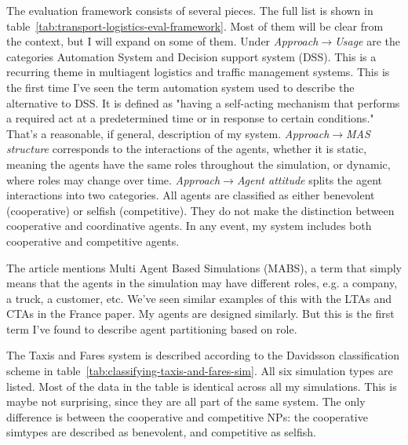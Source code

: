 \documentclass[11pt,letterpaper,onecolumn,twoside,openright,draft]{report}
\begin{document}
The evaluation framework consists of several pieces.
The full list is shown in table~\ref{tab:transport-logistics-eval-framework}.
Most of them will be clear from the context, but I will expand on some of them.
Under \emph{Approach}$\to$\emph{Usage} are the categories Automation System and Decision support system (DSS).
This is a recurring theme in multiagent logistics and traffic management systems.
This is the first time I've seen the term automation system used to describe the alternative to DSS.
It is defined as "having a self-acting mechanism that performs a required act at a predetermined time or in response to certain conditions."
That's a reasonable, if general, description of my system.
\emph{Approach}$\to$\emph{MAS structure} corresponds to the interactions of the agents, whether it is static, meaning the agents have the same roles throughout the simulation, or dynamic, where roles may change over time.
\emph{Approach}$\to$\emph{Agent attitude} splits the agent interactions into two categories.
All agents are classified as either benevolent (cooperative) or selfish (competitive).
They do not make the distinction between cooperative and coordinative agents.
In any event, my system includes both cooperative and competitive agents.

The article mentions Multi Agent Based Simulations (MABS), a term that simply means that the agents in the simulation may have different roles, e.g. a company, a truck, a customer, etc.
We've seen similar examples of this with the LTAs and CTAs in the France paper.
My agents are designed similarly.
But this is the first term I've found to describe agent partitioning based on role.

The Taxis and Fares system is described according to the Davidsson classification scheme in table~\ref{tab:classifying-taxis-and-fares-sim}.
All six simulation types are listed.
Most of the data in the table is identical across all my simulations.
This is maybe not surprising, since they are all part of the same system.
The only difference is between the cooperative and competitive NPs: the cooperative simtypes are described as benevolent, and competitive as selfish.
\end{document}
